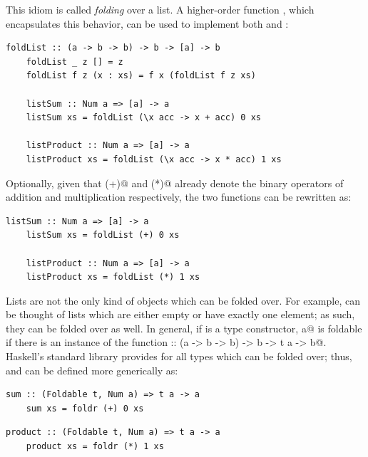 \documentclass[UdineBachThesis,american,11pt]{PhdThesis}
\begin{document}
  This idiom is called \emph{folding} over a list. A higher-order function
  \lstinline@foldList@, which encapsulates this behavior, can be used to
  implement both \lstinline@listSum@ and \lstinline@listProduct@:

  \begin{lstlisting}[gobble=4,basicstyle=\ttfamily\small]
    foldList :: (a -> b -> b) -> b -> [a] -> b
    foldList _ z [] = z
    foldList f z (x : xs) = f x (foldList f z xs)

    listSum :: Num a => [a] -> a
    listSum xs = foldList (\x acc -> x + acc) 0 xs

    listProduct :: Num a => [a] -> a
    listProduct xs = foldList (\x acc -> x * acc) 1 xs
  \end{lstlisting}

  Optionally, given that \lstinline@(+)@ and \lstinline@(*)@ already denote the
  binary operators of addition and multiplication respectively, the two
  functions can be rewritten as:

  \begin{lstlisting}[gobble=4,basicstyle=\ttfamily\small]
    listSum :: Num a => [a] -> a
    listSum xs = foldList (+) 0 xs

    listProduct :: Num a => [a] -> a
    listProduct xs = foldList (*) 1 xs
  \end{lstlisting}

  Lists are not the only kind of objects which can be folded over. For example,
  \lstinline@Maybe@s can be thought of lists which are either empty or have
  exactly one element; as such, they can be folded over as well. In general, if
  \lstinline@t@ is a type constructor, \lstinline@t a@ is foldable if there is
  an instance of the function
  \lstinline@foldr :: (a -> b -> b) -> b -> t a -> b@. Haskell's standard
  library provides \lstinline@foldr@ for all types which can be folded over;
  thus, \lstinline@listSum@ and \lstinline@listProduct@ can be defined more
  generically as:

  \begin{lstlisting}[gobble=4,basicstyle=\ttfamily\small]
    sum :: (Foldable t, Num a) => t a -> a
    sum xs = foldr (+) 0 xs
  \end{lstlisting}

  \newpage

  \begin{lstlisting}[gobble=4,basicstyle=\ttfamily\small]
    product :: (Foldable t, Num a) => t a -> a
    product xs = foldr (*) 1 xs
  \end{lstlisting}
\end{document}
